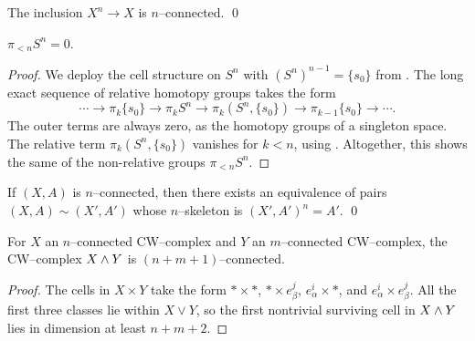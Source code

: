 \begin{corollary}\label{XnIntoXIsNConnected}%
The inclusion $X^n \to X$ is $n$--connected. \qed
\end{corollary}

\begin{corollary}
$\pi_{< n} S^n = 0$.
\end{corollary}
\begin{proof}
We deploy the cell structure on $S^n$ with $(S^n)^{n-1} = \{s_0\}$ from .
The long exact sequence of relative homotopy groups takes the form \[\cdots \to \pi_k \{s_0\} \to \pi_k S^n \to \pi_k (S^n, \{s_0\}) \to \pi_{k-1} \{s_0\} \to \cdots.\]
The outer terms are always zero, as the homotopy groups of a singleton space.
The relative term $\pi_k (S^n, \{s_0\})$ vanishes for $k < n$, using .
Altogether, this shows the same of the non-relative groups $\pi_{<n} S^n$.
\end{proof}

\begin{lemma}\label{NConnectedSpacesHaveSmallModels}%
If $(X, A)$ is $n$--connected, then there exists an equivalence of pairs $(X, A) \sim (X', A')$ whose $n$--skeleton is $(X', A')^n = A'$. \qed
{}
\end{lemma}

\begin{corollary}\label{SmashConnectivityCor}
For $X$ an $n$--connected CW--complex and $Y$ an $m$--connected CW--complex, the CW--complex $X \wedge Y$ is $(n+m+1)$--connected.
\end{corollary}
\begin{proof}
The cells in $X \times Y$ take the form $* \times *$, $* \times e_\beta^j$, $e_\alpha^i \times *$, and $e_\alpha^i \times e_\beta^j$.
All the first three classes lie within $X \vee Y$, so the first nontrivial surviving cell in $X \wedge Y$ lies in dimension at least $n + m + 2$.
\end{proof}

